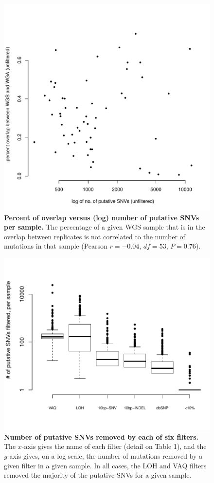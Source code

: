 \documentclass[11pt]{article} %
\begin{document}
\begin{figure}
\centerline{
\includegraphics[width=5in]{unfiltered_total_muts_v_percent_overlap.pdf} }
\caption{\textbf{Percent of overlap versus (log) number of putative SNVs per sample.} The percentage of a given WGS sample that is in the overlap between replicates is not correlated to the number of mutations in that sample (Pearson $r=-0.04$, $df=53$, $P=0.76$).}
\label{fig:unfiltered_total_muts}
\end{figure}

\begin{figure}
\centerline{
\includegraphics[width=6in]{boxplot_number_filtered.pdf} }
\caption{\textbf{Number of putative SNVs removed by each of six filters.} The $x$-axis gives the name of each filter (detail on Table 1), and the $y$-axis gives, on a log scale, the number of mutations removed by a given filter in a given sample. In all cases, the LOH and VAQ filters removed the majority of the putative SNVs for a given sample.}
\label{fig:boxplot_number_filtered}
\end{figure}
\end{document}
